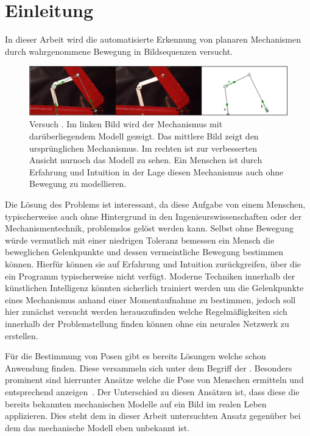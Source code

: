%

\chapter{Einleitung}
\label{ch:einleitung}

In dieser Arbeit wird die automatisierte Erkennung von planaren Mechanismen durch wahrgenommene Bewegung in Bildsequenzen versucht.

\begin{figure}
\centering
    \includegraphics[width=\textwidth]{gfx/werkzeugkoffer_impl.png}
    \caption[Versuch ]{Versuch . Im linken Bild wird der Mechanismus mit darüberliegendem  Modell gezeigt. Das mittlere Bild zeigt den ursprünglichen Mechanismus. Im rechten ist zur verbesserten Ansicht nurnoch das  Modell zu sehen. Ein Menschen ist durch Erfahrung und Intuition in der Lage diesen Mechanismus auch ohne Bewegung zu modellieren.}\label{fig:werkzeugkoffer_impl}
\end{figure}

Die Lösung des Problems ist interessant, da diese Aufgabe von einem Menschen, typischerweise auch ohne Hintergrund in den Ingenieurswissenschaften oder der Mechanismentechnik, problemslos gelöst werden kann.
Selbst ohne Bewegung würde vermutlich mit einer niedrigen Toleranz bemessen ein Mensch die beweglichen Gelenkpunkte und dessen vermeintliche Bewegung bestimmen können.
Hierfür können sie auf Erfahrung und Intuition zurückgreifen, über die ein Programm typischerweise nicht verfügt.
Moderne Techniken innerhalb der künstlichen Intelligenz könnten sicherlich trainiert werden um die Gelenkpunkte eines Mechanismus anhand einer Momentaufnahme zu bestimmen, jedoch soll hier zunächst versucht werden herauszufinden welche Regelmäßigkeiten sich innerhalb der Problemstellung finden können ohne ein neurales Netzwerk zu erstellen.

Für die Bestimmung von Posen gibt es bereits Lösungen welche schon Anwendung finden.
Diese versammeln sich unter dem Begriff der .
Besonders prominent sind hierrunter Ansätze welche die Pose von Menschen ermitteln und entsprechend anzeigen~\cite{Papandreou2018, Google2021, Google2021a}.
Der Unterschied zu diesen Ansätzen ist, dass diese die bereits bekannten mechanischen Modelle auf ein Bild im realen Leben applizieren.
Dies steht dem in dieser Arbeit untersuchten Ansatz gegenüber bei dem das mechanische Modell eben unbekannt ist.

